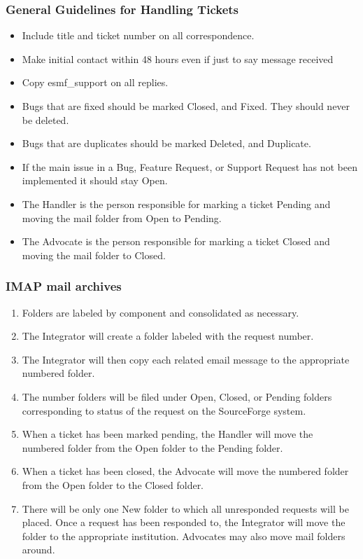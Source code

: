 \subsubsection{General Guidelines for Handling Tickets}
\begin{itemize}
\item Include title and ticket number on all correspondence.
\item Make initial contact within 48 hours even if just to say message received
\item Copy esmf\_support on all replies.
\item Bugs that are fixed should be marked Closed, and Fixed. They should never be deleted. 
\item Bugs that are duplicates should be marked Deleted, and Duplicate. 
\item If the main issue in a Bug, Feature Request, or Support Request has not been implemented it should stay Open.
\item The Handler is the person responsible for marking a ticket Pending and moving the mail folder from Open to Pending.
\item The Advocate is the person responsible for marking a ticket Closed and moving the mail folder to Closed.
\end{itemize}

\subsubsection{IMAP mail archives}
\begin{enumerate}
\item Folders are labeled by component and consolidated as necessary.
\item The Integrator will create a folder labeled with the request number. 
\item The Integrator will then copy each related email message to the appropriate 
numbered folder. 
\item The number folders will be filed under Open, Closed, or Pending folders 
corresponding to status of the request on the SourceForge system.

\item When a ticket has been marked pending, the Handler will move the numbered folder from the Open folder to the Pending folder.
\item When a ticket has been closed, the Advocate will move the numbered folder from the Open folder to the Closed folder.
\item There will be only one New folder to which all unresponded requests will be placed. Once a request has been responded to, the Integrator will move the folder to the appropriate institution. Advocates may also move mail folders around.
\end{enumerate}

